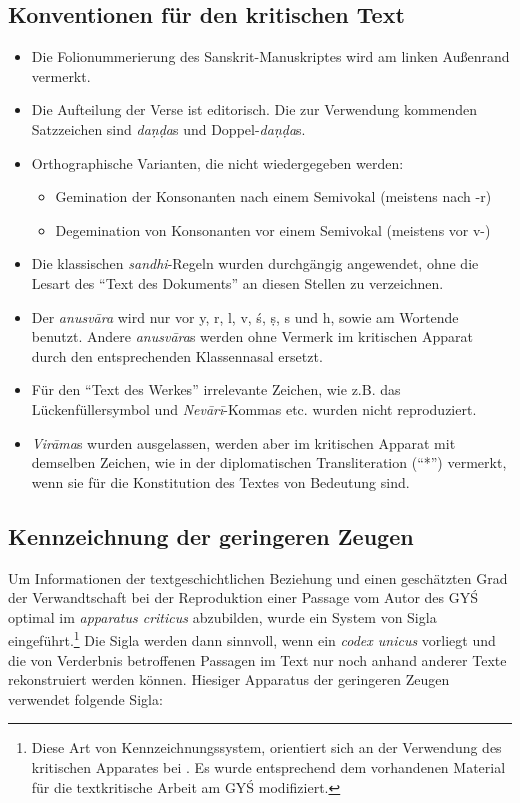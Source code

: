 \documentclass[a4paper,12pt]{article}
\begin{document}
\subsection{Konventionen für den kritischen Text}
\label{konvkrit}

\begin{itemize}
\item Die Folionummerierung des Sanskrit-Manuskriptes wird am linken Außenrand vermerkt. 
\item Die Aufteilung der Verse ist editorisch. Die zur Verwendung kommenden Satzzeichen sind \textit{daṇḍa}s und Doppel-\textit{daṇḍa}s. 
\item Orthographische Varianten, die nicht wiedergegeben werden:
\begin{itemize}
       \item Gemination der Konsonanten nach einem Semivokal (meistens nach -r)
       \item Degemination von Konsonanten vor einem Semivokal (meistens vor v-)
\end{itemize}
\item Die klassischen \textit{sandhi}-Regeln wurden durchgängig angewendet, ohne die Lesart des ``Text des Dokuments'' an diesen Stellen zu verzeichnen. 
\item Der \textit{anusvāra} wird nur vor y, r, l, v, ś, ṣ, s und h, sowie am Wortende benutzt. Andere \textit{anusvāra}s werden ohne Vermerk im kritischen Apparat durch den entsprechenden Klassennasal ersetzt.
\item Für den ``Text des Werkes'' irrelevante Zeichen, wie z.B. das Lückenfüllersymbol und \textit{Nevārī}-Kommas etc. wurden nicht reproduziert.  
\item \textit{Virāma}s wurden ausgelassen, werden aber im kritischen Apparat mit demselben Zeichen, wie in der diplomatischen Transliteration (``*'') vermerkt, wenn sie für die Konstitution des Textes von Bedeutung sind.
\end{itemize}
\subsection{Kennzeichnung der geringeren Zeugen}
\label{kennz}

Um Informationen der textgeschichtlichen Beziehung und einen geschätzten Grad der Verwandtschaft bei der Reproduktion einer Passage vom Autor des GYŚ optimal im \textit{apparatus criticus} abzubilden, wurde ein System von Sigla eingeführt.\footnote{Diese Art von Kennzeichnungssystem, orientiert sich an der Verwendung des kritischen Apparates bei \parencite[lii-liii]{steinkellner2005}. Es wurde entsprechend dem vorhandenen Material für die textkritische Arbeit am GYŚ modifiziert.} Die Sigla werden dann sinnvoll, wenn ein \textit{codex unicus} vorliegt und die von Verderbnis betroffenen Passagen im Text nur noch anhand anderer Texte rekonstruiert werden können. Hiesiger Apparatus der geringeren Zeugen verwendet folgende Sigla:
\end{document}
